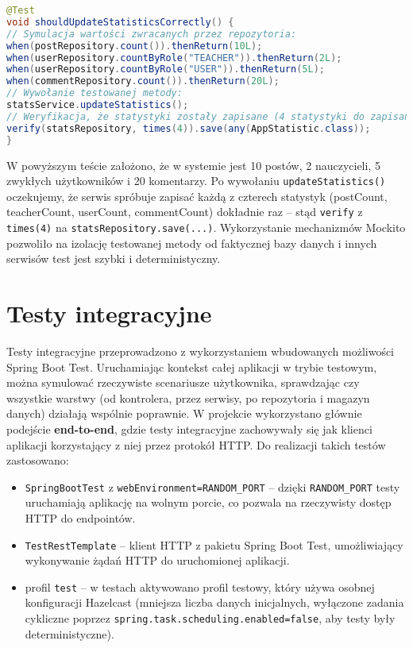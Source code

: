 \begin{lstlisting}[language=Java,
  caption={test kodu aktualizowania statystyk. Źródło: opracowanie własne},
  label={lst:testStatisticUpdater},
  captionpos=b]
@Test
void shouldUpdateStatisticsCorrectly() {
// Symulacja wartości zwracanych przez repozytoria:
when(postRepository.count()).thenReturn(10L);
when(userRepository.countByRole("TEACHER")).thenReturn(2L);
when(userRepository.countByRole("USER")).thenReturn(5L);
when(commentRepository.count()).thenReturn(20L);
// Wywołanie testowanej metody:
statsService.updateStatistics();
// Weryfikacja, że statystyki zostały zapisane (4 statystyki do zapisania):
verify(statsRepository, times(4)).save(any(AppStatistic.class));
}
\end{lstlisting} W powyższym teście założono, że w systemie jest 10 postów, 2 nauczycieli, 5 zwykłych użytkowników i 20 komentarzy. Po wywołaniu \texttt{updateStatistics()} oczekujemy, że serwis spróbuje zapisać każdą z czterech statystyk (postCount, teacherCount, userCount, commentCount) dokładnie raz – stąd \texttt{verify} z \texttt{times(4)} na \texttt{statsRepository.save(...)}. Wykorzystanie mechanizmów Mockito pozwoliło na izolację testowanej metody od faktycznej bazy danych i innych serwisów  test jest szybki i deterministyczny. \section{Testy integracyjne} Testy integracyjne przeprowadzono z wykorzystaniem wbudowanych możliwości Spring Boot Test. Uruchamiając kontekst całej aplikacji w trybie testowym, można symulować rzeczywiste scenariusze użytkownika, sprawdzając czy wszystkie warstwy (od kontrolera, przez serwisy, po repozytoria i magazyn danych) działają wspólnie poprawnie. W projekcie wykorzystano głównie podejście \textbf{end-to-end}, gdzie testy integracyjne zachowywały się jak klienci aplikacji korzystający z niej przez protokół HTTP. Do realizacji takich testów zastosowano:
\begin{itemize}
  \item \texttt{SpringBootTest} z \texttt{webEnvironment=RANDOM\_PORT} --
dzięki \texttt{RANDOM\_PORT} testy uruchamiają aplikację na wolnym porcie, co pozwala na rzeczywisty dostęp HTTP do endpointów.
  \item \texttt{TestRestTemplate} --  klient HTTP z pakietu Spring Boot Test, umożliwiający wykonywanie żądań HTTP do uruchomionej aplikacji.
  \item profil \texttt{test} -- w testach aktywowano profil testowy, który
    używa osobnej konfiguracji Hazelcast (mniejsza liczba danych
    inicjalnych, wyłączone zadania cykliczne poprzez
    \texttt{spring.task.scheduling.enabled=false}, aby testy były
    deterministyczne).
\end{itemize}
